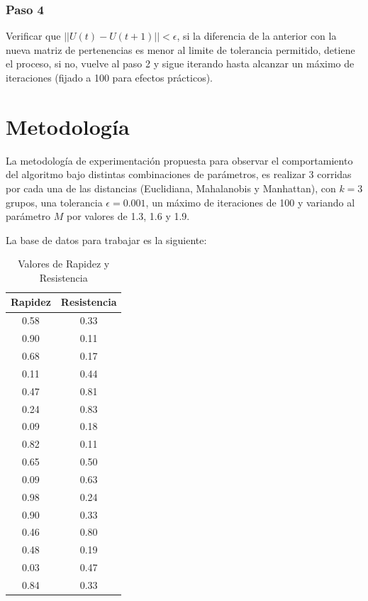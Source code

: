 \documentclass[11pt, letterpaper]{article}
\begin{document}
\subsubsection{Paso 4}

Verificar que $||U(t)-U(t+1)||<\epsilon$, si la diferencia de la anterior con la nueva matriz de pertenencias es menor al limite de tolerancia permitido, detiene el proceso, si no, vuelve al paso 2 y sigue iterando hasta alcanzar un máximo de iteraciones (fijado a 100 para efectos prácticos).


\newpage

\section{Metodología}


La metodología de experimentación propuesta para observar el comportamiento del algoritmo bajo distintas combinaciones de parámetros, es realizar 3 corridas por cada una de las distancias (Euclidiana, Mahalanobis y Manhattan), con $k=3$ grupos, una tolerancia $\epsilon = 0.001$, un máximo de iteraciones de 100  y variando al parámetro $M$ por valores de 1.3, 1.6 y 1.9.

La base de datos para trabajar es la siguiente:


\begin{table}[ht]
	\centering
	\begin{tabular}{cc}
		\hline
		\textbf{Rapidez} & \textbf{Resistencia} \\
		\hline
		0.58 & 0.33 \\
		0.90 & 0.11 \\
		0.68 & 0.17 \\
		0.11 & 0.44 \\
		0.47 & 0.81 \\
		0.24 & 0.83 \\
		0.09 & 0.18 \\
		0.82 & 0.11 \\
		0.65 & 0.50 \\
		0.09 & 0.63 \\
		0.98 & 0.24 \\
		0.90 & 0.33 \\
		0.46 & 0.80 \\
		0.48 & 0.19 \\
		0.03 & 0.47 \\
		0.84 & 0.33 \\
		\hline
	\end{tabular}
	\caption{Valores de Rapidez y Resistencia}
	\label{tab:rapidez_resistencia}
\end{table}
\end{document}
